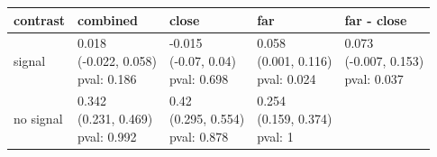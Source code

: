 


\centering
\begin{tabular}[t]{l|l|l|l|l}
\hline
contrast & combined & close & far & far - close\\
\hline
signal & \makecell[c]{0.018\\(-0.022, 0.058)\\pval: 0.186} & \makecell[c]{-0.015\\(-0.07, 0.04)\\pval: 0.698} & \makecell[c]{0.058\\(0.001, 0.116)\\pval: 0.024} & \makecell[c]{0.073\\(-0.007, 0.153)\\pval: 0.037}\\
\hline
no signal & \makecell[c]{0.342\\(0.231, 0.469)\\pval: 0.992} & \makecell[c]{0.42\\(0.295, 0.554)\\pval: 0.878} & \makecell[c]{0.254\\(0.159, 0.374)\\pval: 1} & \\
\hline
\end{tabular}

